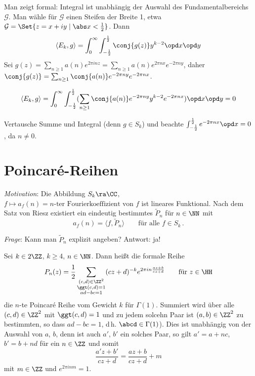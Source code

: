 \begin{bewe}
	Man zeigt formal: Integral ist unabhängig der Auswahl des Fundamentalbereichs $\mathcal G$.
	Man wähle für $\mathcal G$ einen Steifen der Breite 1, etwa $\mathcal G = \Set{z = x + iy \mid \abs x < \frac{1}{2}}$.
	Dann
	\[
		\langle E_k, g \rangle = \int_0^\infty \int_{-\frac{1}{2}}^{\frac{1}{2}} \conj{g(z)} y^{k-2} \opd x \opd y
	\]
	Sei $g(z) = \sum_{n\geq 1} a(n) e^{2\pi inz} = \sum_{n \geq 1} a(n) e^{2\pi nx} e^{-2\pi ny}$, daher $\conj{g(z)} = \sum_{n \geq 1} \conj{a(n)} e^{-2\pi ny} e^{-2\pi nx}$.
	
	\begin{align*}
		\langle E_k, g \rangle
		= \int_0^\infty \int_{-\frac{1}{2}}^{\frac{1}{2}} ( \sum_{n\geq 1} \conj{a(n)} e^{-2\pi ny} y^{k-2} e^{-2\pi nx}) \opd x \opd y
		= 0
	\end{align*}
	
	Vertausche Summe und Integral (denn $g \in S_k$) und beachte $\int_{-\frac{1}{2}}^{\frac{1}{2}} e^{-2\pi nx} \opd x = 0$, da $n \not= 0$.
\end{bewe}

\chapter{Poincaré-Reihen}

\emph{Motivation}: Die Abbildung $S_k \ra \CC$, $f \mapsto a_f(n) = \text{$n$-ter Fourierkoeffizient von $f$}$ ist lineares Funktional.
Nach dem Satz von Riesz existiert ein eindeutig bestimmtes $\tilde P_n$ für $n\in\NN$ mit
\[
	a_f(n) = \langle f, \tilde P_n \rangle \qquad \text{für alle } f\in S_k\,.
\]

\emph{Frage}: Kann man $\tilde P_n$ explizit angeben? Antwort: ja!

\begin{defi}
	Sei $k \in 2\ZZ$, $k \geq 4$, $n\in\NN$. Dann heißt die formale Reihe
	\[
		P_n(z)
		= \frac{1}{2} \sum_{\substack{(c,d)\in\ZZ^2 \\ \ggt(c,d) = 1 \\ ad-bc = 1}} (cz+d)^{-k} e^{2\pi in \frac{az+b}{cz+d}}
		\qquad \text{für } z \in \HH
	\]
	die $n$-te Poincaré Reihe vom Gewicht $k$ für $\Gamma(1)$.
	Summiert wird über alle $(c,d) \in \ZZ^2$ mit $\ggt(c,d) = 1$ und zu jedem solcehn Paar ist $(a,b) \in \ZZ^2$ zu bestimmten, so dass $ad-bc = 1$, d\,h. $\abcd \in \Gamma(1)$).
	Dies ist unabhängig von der Auswahl von $a$, $b$, denn ist auch $a'$, $b'$ ein solches Paar, so gilt $a' = a+nc$, $b' = b + nd$ für ein $n \in \ZZ$ und somit
	\[
		\frac{a'z+b'}{cz+d} = \frac{az+b}{cz + d} + m
	\]
	mit $m \in \ZZ$ und $e^{2\pi inm} = 1$.
\end{defi}